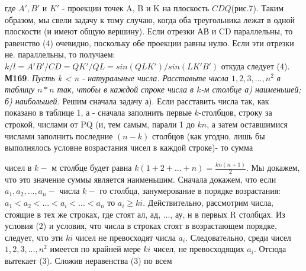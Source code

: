 \documentclass[8pt]{article}
\begin{document}
\begin{multicols}{2}
\newline 
где $A', B'$ и $K'$ - проекции точек A, B и K на плоскость $CDQ$(рис.7). Таким образом, мы свели задачу к тому случаю, когда оба треугольника лежат в одной плоскости (и имеют общую вершину). Если отрезки АВ и CD параллельны, то равенство (4) очевидно, поскольку обе проекции равны нулю. Если эти отрезки не. параллельны, то получаем:
 \newline $k/l = {A'B'}/{CD} = {QK'}/{QL} = {sin(QLK')}/{sin(LK'B')}$
\newline 
откуда следует (4).
\newline \textbf{М169}. \textit{Пусть k < n - натуральные числа. Расставьте числа $1, 2, 3, ..., n^{2}$ в таблицу $n \ast n$ так, чтобы в каждой спроке числа в $k$-м столбце а) наименьшей; б) наибольшей.}
\newline
\hspace*{8mm} Решим сначала задачу а).
\newline
\hspace*{8mm} Если расставить числа так, как показано в таблице 1, а - сначала заполнить первые $k$-столбцов, строку за строкой, числами от
PQ (и, тем самым, парали
1 до $kn$, а затем оставшимися числами заполнить последние $(n - k)$ столбцов (как угодно, лишь бы выполнялось условне возрастания чисел в каждой строке)- то сумма 

чисел в $k-$ м столбце будет равна
\newline $k (1 + 2 + ... + n) = \frac{kn(n+1)}{2}.$
\newline Мы докажем, что это значение суммы является наименьшим. Сначала докажем, что если $a_{1}, a_{2}, ..., a_{n} -$ числа $k - $ го столбца, занумерование в порядке возрастания:
\newline 
\hspace*{20.0mm} $a_{1} < a_{2} < ... < a_{i} < ... < a_{n}$
\newline то
\newline 
\hspace*{20.0mm} $a_{i} \ge ki.$
\newline Действительно, рассмотрим числа, стоящие в тех же строках, где стоят ал, ад, ..., ау, н в первых R столбцах. Из условия (2) и условия, что числа в строках стоят в возрастающем порядке, следует, что эти $ki$ чисел не превосходят числа $a_{i}$. Следовательно, среди чисел $1, 2, 3, ..., n^{2}$ имеется по крайней мере $ki$ чисел, не превосходящих $a_{i}$. Отсюда вытекает (3). Сложив неравенства (3) по всем



\end{multicols}
\end{document}
